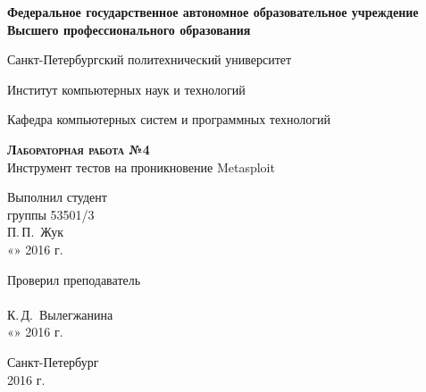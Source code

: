 \documentclass[10pt,a4paper,titlepage]{article}
\begin{document}
\begin{titlepage}
  \begin{center}
    \large
    \textbf{Федеральное государственное автономное образовательное учреждение\\
    Высшего профессионального образования}

    \vspace{0.25cm}

    Санкт-Петербургский политехнический университет
    \vspace{0.25cm}
    
    Институт компьютерных наук и технологий
    \vspace{0.25cm}
    
    Кафедра компьютерных систем и программных технологий
    \vfill

    \textbf{\textsc{Лабораторная работа №4}}\\[5mm]
    
    {\LARGE Инструмент тестов на проникновение Metasploit}
  \bigskip
    
\end{center}
\vfill

\newlength{\ML}
\hfill\begin{minipage}{0.4\textwidth}
  Выполнил студент\\ группы 53501/3\\
  \underline{\hspace{\ML}} П.\,П.~Жук\\
  «\underline{\hspace{0.7cm}}» \underline{\hspace{2cm}} 2016 г.
\end{minipage}%
\bigskip

\hfill\begin{minipage}{0.4\textwidth}
  Проверил преподаватель\\
  \underline{\hspace{\ML}}\\ К.\,Д.~Вылегжанина\\
  «\underline{\hspace{0.7cm}}» \underline{\hspace{2cm}} 2016 г.
\end{minipage}%
\vfill

\begin{center}
  Санкт-Петербург\\ 2016 г.
\end{center}
\end{titlepage}
\end{document}
